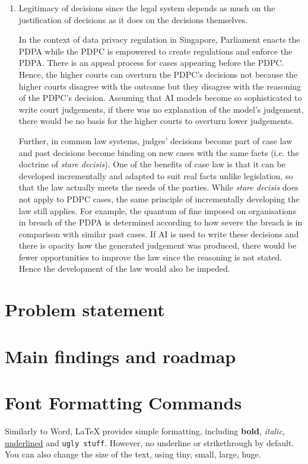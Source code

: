 \begin{enumerate}
  \item Legitimacy of decisions since the legal system depends as much on the justification of decisions as it does on the decisions themselves.
  
  In the context of data privacy regulation in Singapore, Parliament enacts the PDPA while the PDPC is empowered to create regulations and enforce the PDPA. There is an appeal process for cases appearing before the PDPC. Hence, the higher courts can overturn the PDPC's decisions not because the higher courts disagree with the outcome but they disagree with the reasoning of the PDPC's decision. Assuming that AI models become so sophisticated to write court judgements, if there was no explanation of the model's judgement, there would be no basis for the higher courts to overturn lower judgements. 
  
  Further, in common law systems, judges' decisions become part of case law and past decisions become binding on new cases with the same facts (i.e. the doctrine of \textit{stare decisis}). One of the benefits of case law is that it can be developed incrementally and adapted to suit real facts unlike legislation, so that the law actually meets the needs of the parties. While \textit{stare decisis} does not apply to PDPC cases, the same principle of incrementally developing the law still applies. For example, the quantum of fine imposed on organisations in breach of the PDPA is determined according to how severe the breach is in comparison with similar past cases. If AI is used to write these decisions and there is opacity how the generated judgement was produced, there would be fewer opportunities to improve the law since the reasoning is not stated. Hence the development of the law would also be impeded.
\end{enumerate}

\section{Problem statement}

\section{Main findings and roadmap}


\section{Font Formatting Commands}
Similarly to Word, LaTeX provides simple formatting, including \textbf{bold}, \textit{italic}, \underline{underlined} and \texttt{ugly stuff}.
However, no underline or strikethrough by default.
You can also change the size of the text, using {\tiny tiny}, {\small small}, {\large large}, {\huge huge}.

